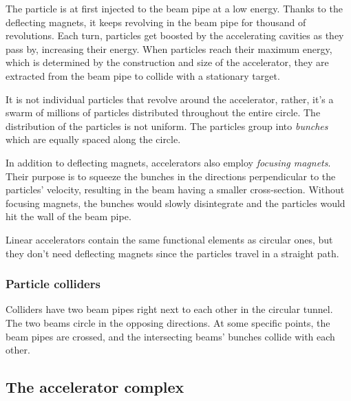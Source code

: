 \documentclass[12pt]{article}
\begin{document}
The particle is at first injected to the beam pipe at a low energy. Thanks to the deflecting magnets, it keeps revolving in the beam pipe for thousand of revolutions. Each turn, particles get boosted by the accelerating cavities as they pass by, increasing their energy. When particles reach their maximum energy, which is determined by the construction and size of the accelerator, they are extracted from the beam pipe to collide with a stationary target.

It is not individual particles that revolve around the accelerator, rather, it's a swarm of millions of particles distributed throughout the entire circle. The distribution of the particles is not uniform. The particles group into \textit{bunches} which are equally spaced along the circle.

In addition to deflecting magnets, accelerators also employ \textit{focusing magnets}. Their purpose is to squeeze the bunches in the directions perpendicular to the particles' velocity, resulting in the beam having a smaller cross-section. Without focusing magnets, the bunches would slowly disintegrate and the particles would hit the wall of the beam pipe.

Linear accelerators contain the same functional elements as circular ones, but they don't need deflecting magnets since the particles travel in a straight path.


\subsubsection{Particle colliders}\label{sec_part_collider}

Colliders have two beam pipes right next to each other in the circular tunnel. The two beams circle in the opposing directions. At some specific points, the beam pipes are crossed, and the intersecting beams' bunches collide with each other.


\subsection{The accelerator complex}\label{sec_accel_complex}
\end{document}
